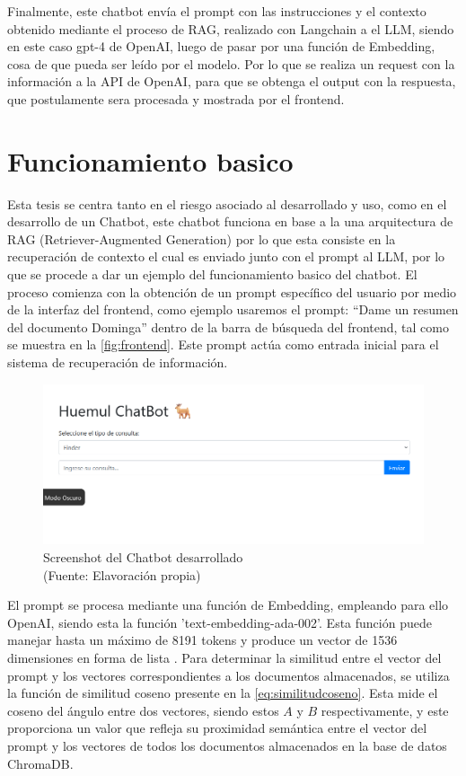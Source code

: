 Finalmente, este chatbot envía el prompt con las instrucciones y el contexto obtenido mediante el proceso de RAG, realizado con 
Langchain a el LLM, siendo en este caso gpt-4 de OpenAI, luego de pasar por una función de Embedding, cosa de que 
pueda ser leído por el modelo. Por lo que se realiza un request con la información a la API de OpenAI, para que se 
obtenga el output con la respuesta, que postulamente sera procesada y mostrada por el frontend.

\newpage

\section{Funcionamiento basico}

Esta tesis se centra tanto en el riesgo asociado al desarrollado y uso, como en el desarrollo de un Chatbot, este chatbot funciona 
en base a la una arquitectura de RAG (Retriever-Augmented Generation) por lo que esta consiste en 
la recuperación de contexto el cual es enviado junto con el prompt al LLM, por lo que se procede a dar un ejemplo del funcionamiento basico del chatbot. El proceso comienza con 
la obtención de un prompt específico del usuario por medio de la interfaz del frontend, como ejemplo usaremos el prompt: ``Dame un resumen del documento Dominga'' 
dentro de la barra de búsqueda del frontend, tal como se muestra en la \autoref{fig:frontend}. Este prompt actúa como entrada inicial para el sistema de recuperación de información.

\begin{figure}[ht!]
    \centering
    \includegraphics[width=.9\textwidth]{figures/website.png}
    \caption[Screenshot del Chatbot desarrollado]{Screenshot del Chatbot desarrollado\\
    {\scriptsize (Fuente: Elavoración propia)}}
    \label{fig:frontend}
\end{figure}

El prompt se procesa mediante una función de Embedding, empleando para ello OpenAI, siendo esta  
la función 'text-embedding-ada-002'. Esta función puede manejar hasta un máximo de 8191 tokens y 
produce un vector de 1536 dimensiones en forma de lista \cite{openai1}. Para determinar la similitud entre el 
vector del prompt y los vectores correspondientes a los documentos almacenados, se utiliza la función 
de similitud coseno presente en la \autoref{eq:similitudcoseno}. Esta mide el coseno del ángulo entre dos vectores,
siendo estos $A$ y $B$ respectivamente, y este proporciona un valor que refleja su proximidad semántica entre el vector
del prompt y los vectores de todos los documentos almacenados en la base de datos ChromaDB.


